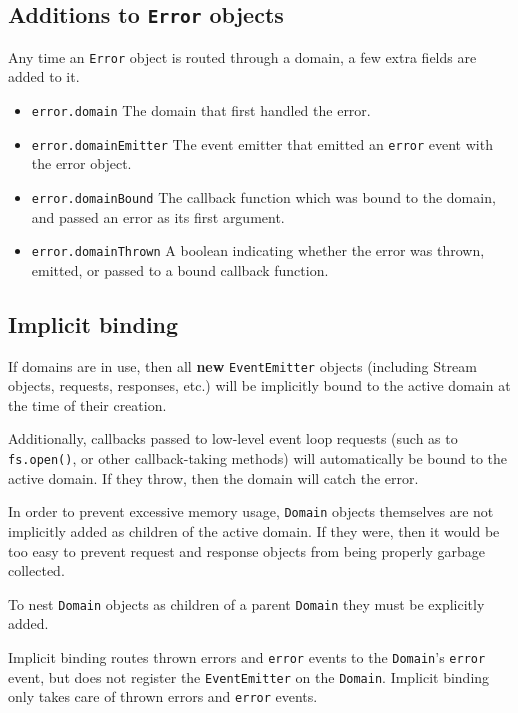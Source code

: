 \subsection{\texorpdfstring{Additions to \texttt{Error}
objects}{Additions to Error objects}}\label{additions-to-error-objects}

Any time an \texttt{Error} object is routed through a domain, a few
extra fields are added to it.

\begin{itemize}
\tightlist
\item
  \texttt{error.domain} The domain that first handled the error.
\item
  \texttt{error.domainEmitter} The event emitter that emitted an
  \texttt{\textquotesingle{}error\textquotesingle{}} event with the
  error object.
\item
  \texttt{error.domainBound} The callback function which was bound to
  the domain, and passed an error as its first argument.
\item
  \texttt{error.domainThrown} A boolean indicating whether the error was
  thrown, emitted, or passed to a bound callback function.
\end{itemize}

\subsection{Implicit binding}\label{implicit-binding}

If domains are in use, then all \textbf{new} \texttt{EventEmitter}
objects (including Stream objects, requests, responses, etc.) will be
implicitly bound to the active domain at the time of their creation.

Additionally, callbacks passed to low-level event loop requests (such as
to \texttt{fs.open()}, or other callback-taking methods) will
automatically be bound to the active domain. If they throw, then the
domain will catch the error.

In order to prevent excessive memory usage, \texttt{Domain} objects
themselves are not implicitly added as children of the active domain. If
they were, then it would be too easy to prevent request and response
objects from being properly garbage collected.

To nest \texttt{Domain} objects as children of a parent \texttt{Domain}
they must be explicitly added.

Implicit binding routes thrown errors and
\texttt{\textquotesingle{}error\textquotesingle{}} events to the
\texttt{Domain}'s \texttt{\textquotesingle{}error\textquotesingle{}}
event, but does not register the \texttt{EventEmitter} on the
\texttt{Domain}. Implicit binding only takes care of thrown errors and
\texttt{\textquotesingle{}error\textquotesingle{}} events.

